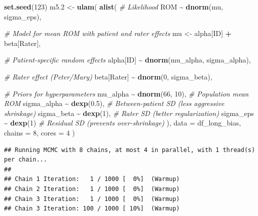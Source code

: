 \documentclass[
]{article}
\newenvironment{Shaded}{\begin{snugshade}}{\end{snugshade}}
\newcommand{\AttributeTok}[1]{\textcolor[rgb]{0.13,0.29,0.53}{#1}}
\newcommand{\CommentTok}[1]{\textcolor[rgb]{0.56,0.35,0.01}{\textit{#1}}}
\newcommand{\DecValTok}[1]{\textcolor[rgb]{0.00,0.00,0.81}{#1}}
\newcommand{\FloatTok}[1]{\textcolor[rgb]{0.00,0.00,0.81}{#1}}
\newcommand{\FunctionTok}[1]{\textcolor[rgb]{0.13,0.29,0.53}{\textbf{#1}}}
\newcommand{\NormalTok}[1]{#1}
\newcommand{\OtherTok}[1]{\textcolor[rgb]{0.56,0.35,0.01}{#1}}
\newcommand{\SpecialCharTok}[1]{\textcolor[rgb]{0.81,0.36,0.00}{\textbf{#1}}}
\begin{document}
\begin{Shaded}
\begin{Highlighting}[]
\FunctionTok{set.seed}\NormalTok{(}\DecValTok{123}\NormalTok{)}
\NormalTok{m5}\FloatTok{.2} \OtherTok{\textless{}{-}} \FunctionTok{ulam}\NormalTok{(}
  \FunctionTok{alist}\NormalTok{(}
    \CommentTok{\# Likelihood}
\NormalTok{    ROM }\SpecialCharTok{\textasciitilde{}} \FunctionTok{dnorm}\NormalTok{(mu, sigma\_eps),}
    
    \CommentTok{\# Model for mean ROM with patient and rater effects}
\NormalTok{    mu }\OtherTok{\textless{}{-}}\NormalTok{ alpha[ID] }\SpecialCharTok{+}\NormalTok{ beta[Rater],}
    
    \CommentTok{\# Patient{-}specific random effects}
\NormalTok{    alpha[ID] }\SpecialCharTok{\textasciitilde{}} \FunctionTok{dnorm}\NormalTok{(mu\_alpha, sigma\_alpha),}
    
    \CommentTok{\# Rater effect (Peter/Mary)}
\NormalTok{    beta[Rater] }\SpecialCharTok{\textasciitilde{}} \FunctionTok{dnorm}\NormalTok{(}\DecValTok{0}\NormalTok{, sigma\_beta),}
    
    \CommentTok{\# Priors for hyperparameters}
\NormalTok{    mu\_alpha }\SpecialCharTok{\textasciitilde{}} \FunctionTok{dnorm}\NormalTok{(}\DecValTok{66}\NormalTok{, }\DecValTok{10}\NormalTok{),  }\CommentTok{\# Population mean ROM}
\NormalTok{    sigma\_alpha }\SpecialCharTok{\textasciitilde{}} \FunctionTok{dexp}\NormalTok{(}\FloatTok{0.5}\NormalTok{),  }\CommentTok{\# Between{-}patient SD (less aggressive shrinkage)}
\NormalTok{    sigma\_beta }\SpecialCharTok{\textasciitilde{}} \FunctionTok{dexp}\NormalTok{(}\DecValTok{1}\NormalTok{),   }\CommentTok{\# Rater SD (better regularization)}
\NormalTok{    sigma\_eps }\SpecialCharTok{\textasciitilde{}} \FunctionTok{dexp}\NormalTok{(}\DecValTok{1}\NormalTok{)     }\CommentTok{\# Residual SD (prevents over{-}shrinkage)}
\NormalTok{  ), }
  \AttributeTok{data =}\NormalTok{ df\_long\_bias, }
  \AttributeTok{chains =} \DecValTok{8}\NormalTok{, }\AttributeTok{cores =} \DecValTok{4}
\NormalTok{)}
\end{Highlighting}
\end{Shaded}

\begin{verbatim}
## Running MCMC with 8 chains, at most 4 in parallel, with 1 thread(s) per chain...
## 
## Chain 1 Iteration:   1 / 1000 [  0%]  (Warmup) 
## Chain 2 Iteration:   1 / 1000 [  0%]  (Warmup) 
## Chain 3 Iteration:   1 / 1000 [  0%]  (Warmup) 
## Chain 3 Iteration: 100 / 1000 [ 10%]  (Warmup)
\end{verbatim}
\end{document}
